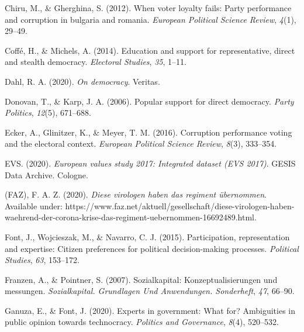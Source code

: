 \documentclass[
  12pt,
  english,
]{article}
\newlength{\cslhangindent}
\newlength{\cslentryspacingunit} %
\newenvironment{CSLReferences}[2] %
 {%
  \setlength{\parindent}{0pt}
  \ifodd #1
  \let\oldpar\par
  \def\par{\hangindent=\cslhangindent\oldpar}
  \fi
  \setlength{\parskip}{#2\cslentryspacingunit}
 }%
 {}
\begin{document}
\begin{CSLReferences}{1}{0}
\leavevmode{}%
Chiru, M., \& Gherghina, S. (2012). When voter loyalty fails: Party
performance and corruption in bulgaria and romania. \emph{European
Political Science Review}, \emph{4}(1), 29--49.

\leavevmode{}%
Coffé, H., \& Michels, A. (2014). Education and support for
representative, direct and stealth democracy. \emph{Electoral Studies},
\emph{35}, 1--11.

\leavevmode{}%
Dahl, R. A. (2020). \emph{On democracy}. Veritas.

\leavevmode{}%
Donovan, T., \& Karp, J. A. (2006). Popular support for direct
democracy. \emph{Party Politics}, \emph{12}(5), 671--688.

\leavevmode{}%
Ecker, A., Glinitzer, K., \& Meyer, T. M. (2016). Corruption performance
voting and the electoral context. \emph{European Political Science
Review}, \emph{8}(3), 333--354.

\leavevmode{}%
EVS. (2020). \emph{European values study 2017: Integrated dataset (EVS
2017)}. GESIS Data Archive. Cologne.

\leavevmode{}%
(FAZ), F. A. Z. (2020). \emph{Diese virologen haben das regiment
übernommen}. Available under:
https://www.faz.net/aktuell/gesellschaft/diese-virologen-haben-waehrend-der-corona-krise-das-regiment-uebernommen-16692489.html.

\leavevmode{}%
Font, J., Wojcieszak, M., \& Navarro, C. J. (2015). Participation,
representation and expertise: Citizen preferences for political
decision-making processes. \emph{Political Studies}, \emph{63},
153--172.

\leavevmode{}%
Franzen, A., \& Pointner, S. (2007). Sozialkapital: Konzeptualisierungen
und messungen. \emph{Sozialkapital. Grundlagen Und Anwendungen.
Sonderheft}, \emph{47}, 66--90.

\leavevmode{}%
Ganuza, E., \& Font, J. (2020). Experts in government: What for?
Ambiguities in public opinion towards technocracy. \emph{Politics and
Governance}, \emph{8}(4), 520--532.


\end{CSLReferences}
\end{document}
